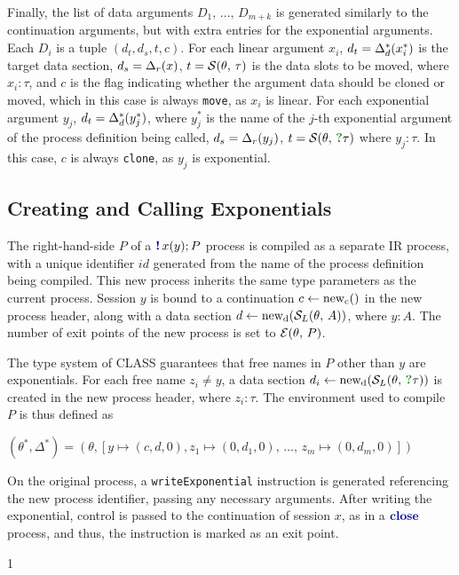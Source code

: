 Finally, the list of data arguments $D_1,\,\dots,\,D_{m+k}$ is generated similarly to the continuation arguments, but with extra entries for the exponential arguments. Each $D_i$ is a tuple $(d_t, d_s, t, c)$. For each linear argument $x_i$, $d_t = \Delta^*_d(x^*_i)$ is the target data section, $d_s = \Delta_r(x)$, $t = \mathcal{S}(\theta,\,\tau)$ is the data slots to be moved, where $x_i: \tau$, and $c$ is the flag indicating whether the argument data should be cloned or moved, which in this case is always \texttt{move}, as $x_i$ is linear. For each exponential argument $y_j$, $d_t = \Delta^*_d(y^*_j)$, where $y^*_j$ is the name of the $j$-th exponential argument of the process definition being called, $d_s = \Delta_r(y_j)$, $t = \slots{\theta}{\whynott{\tau}}$ where $y_j: \tau$. In this case, $c$ is always \texttt{clone}, as $y_j$ is exponential.

\subsection{Creating and Calling Exponentials}

The right-hand-side $P$ of a $\bangc{x}{y}{P}$ process is compiled as a separate \ac{IR} process, with a unique identifier $id$ generated from the name of the process definition being compiled. This new process inherits the same type parameters as the current process. Session $y$ is bound to a continuation $c \leftarrow \text{new}_{\text{c}}()$ in the new process header, along with a data section $d \leftarrow \text{new}_{\text{d}}(\mathcal{S}_L(\theta,\,A))$, where $y: A$. The number of exit points of the new process is set to $\mathcal{E}(\theta,\,P)$.

The type system of \ac{CLASS} guarantees that free names in $P$ other than $y$ are exponentials. For each free name $z_i \neq y$, a data section $\makedata{d_i}{\alllocalslots{\theta}{\whynott{\tau}}}$ is created in the new process header, where $z_i: \tau$. The environment used to compile $P$ is thus defined as \vspace{2pt}\\
\vspace{2pt}\centerline{$(\theta^*, \Delta^*) = (\theta, [y \mapsto (c, d, 0), z_1 \mapsto (0, d_1, 0),\,\dots,\,z_m \mapsto (0, d_m, 0)])$}

On the original process, a \texttt{writeExponential} instruction is generated referencing the new process identifier, passing any necessary arguments. After writing the exponential, control is passed to the continuation of session $x$, as in a $\closep$ process, and thus, the instruction is marked as an exit point.
\begin{compilation}{\theta}{\Delta}{}
{1}
\end{compilation}

